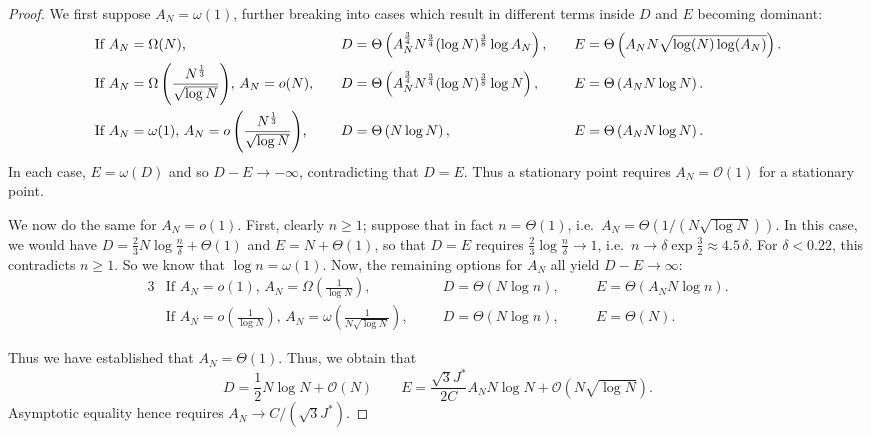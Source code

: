 \documentclass{article}
\begin{document}
\begin{proof}
    We first suppose $A_N = \omega(1)$,
    further breaking into cases which result in different terms inside $D$ and $E$ becoming dominant:
    \begin{alignat*}{3}
        & \text{If $A_N = \Omega(N)$,}
            \quad &&
        D = \Theta\left( A_N^\frac34 N^\frac34 (\log N)^\frac38 \log A_N \right)
            , \quad &&
        E = \Theta\left( A_N N \sqrt{\log(N) \log(A_N)} \right)
            .\\
        & \text{If $A_N = \Omega\left( \frac{N^\frac13}{\sqrt{\log N}} \right)$, $ A_N = o(N)$,}
            \quad &&
        D = \Theta\left( A_N^\frac34 N^\frac34 (\log N)^\frac38 \log N \right)
            , \quad &&
        E = \Theta\left( A_N N \log N \right)
            .\\
        & \text{If $A_N = \omega(1)$, $A_N = o\left( \frac{N^\frac13}{\sqrt{\log N}} \right)$,}
            \quad &&
        D = \Theta\left( N \log N \right)
            , \quad &&
        E = \Theta\left( A_N N \log N \right)
            .
    \end{alignat*}
    In each case, $E = \omega(D)$ and so $D - E \to -\infty$,
    contradicting that $D = E$.
    Thus a stationary point requires $A_N = \mathcal O(1)$ for a stationary point.

    We now do the same for $A_N = o(1)$.
    First, clearly $n \ge 1$; suppose that in fact $n = \Theta(1)$,
    i.e.\ $A_N = \Theta\left( 1 / (N \sqrt{\log N}) \right)$.
    In this case, we would have
    $D = \frac23 N \log \frac n \delta + \Theta(1)$
    and $E = N + \Theta(1)$,
    so that $D = E$ requires $\frac23 \log \frac n \delta \to 1$,
    i.e.\ $n \to \delta \exp \frac32 \approx 4.5 \, \delta$.
    For $\delta < 0.22$,
    this contradicts $n \ge 1$.
    So we know that $\log n = \omega(1)$.
    Now, the remaining options for $A_N$ all yield $D - E \to \infty$:
    \begin{alignat*}{3}
        & \text{If $A_N = o(1)$, $A_N = \Omega\left( \frac{1}{\log N} \right) $,}
            \quad &&
        D = \Theta\left( N \log n \right)
            , \quad &&
        E = \Theta\left( A_N N \log n \right)
            .\\
        & \text{If $A_N = o\left( \frac{1}{\log N} \right)$, $A_N = \omega\left( \frac{1}{N \sqrt{\log N}} \right)$,}
            \quad &&
        D = \Theta\left( N \log n \right)
            , \quad &&
        E = \Theta\left( N \right)
            .
    \end{alignat*}

    Thus we have established that $A_N = \Theta(1)$.
    Thus, we obtain that
    \[
        D = \frac12 N \log N + \mathcal{O}\left( N \right)
        \qquad
        E = \frac{\sqrt{3} J^*}{2 C} A_N N \log N + \mathcal{O}\left( N \sqrt{\log N} \right)
    .\]
    Asymptotic equality hence requires
    $A_N \to C / (\sqrt{3} J^*)$.
\end{proof}
\end{document}
